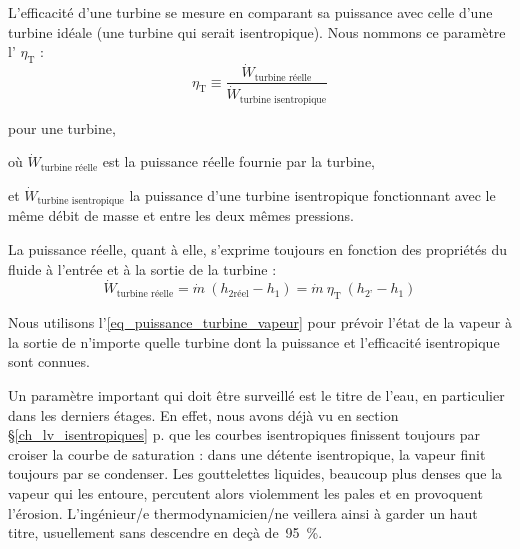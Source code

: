 		L’efficacité d’une turbine se mesure en comparant sa puissance avec celle d’une turbine idéale (une turbine qui serait isentropique). Nous nommons ce paramètre l’ $\eta_\text{T}$ :
		\begin{equation}
			\eta_\text{T} \equiv \frac{\dot{W}_\text{turbine réelle}}{\dot{W}_\text{turbine isentropique}}
			\label{def_efficacité_isentropique_turbine}
		\end{equation}
		\begin{equationterms}
			\item pour une turbine,
			\item où \tab $\dot{W}_\text{turbine réelle}$ 			\tab\tab\tab\tab\tab est la puissance réelle fournie par la turbine,
			\item et \tab $\dot{W}_\text{turbine isentropique}$ 	\tab la puissance d’une turbine isentropique fonctionnant avec le même débit de masse et entre les deux mêmes pressions.
		\end{equationterms}

		La puissance réelle, quant à elle, s’exprime toujours en fonction des propriétés du fluide à l’entrée et à la sortie de la turbine :
		\begin{equation}
			\dot{W}_\text{turbine réelle} = \dot{m} \ (h_{2 \text{réel}} - h_1) = \dot m \ \eta_\text{T} \ (h_{2’} - h_1)
			\label{eq_puissance_turbine_vapeur}
		\end{equation}

		Nous utilisons l’\cref{eq_puissance_turbine_vapeur} pour prévoir l’état de la vapeur à la sortie de n’importe quelle turbine dont la puissance et l’efficacité isentropique sont connues.

		Un paramètre important qui doit être surveillé est le titre de l’eau, en particulier dans les derniers étages. En effet, nous avons déjà vu en section \S\ref{ch_lv_isentropiques} p.\pageref{ch_lv_isentropiques} que les courbes isentropiques finissent toujours par croiser la courbe de saturation : dans une détente isentropique, la vapeur finit toujours par se condenser. Les gouttelettes liquides, beaucoup plus denses que la vapeur qui les entoure, percutent alors violemment les pales et en provoquent l’érosion. L’ingénieur/e thermodynamicien/ne veillera ainsi à garder un haut titre, usuellement sans descendre en deçà de~\SI{95}{\percent}.


